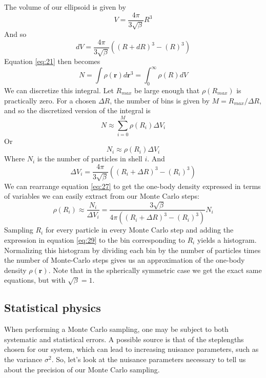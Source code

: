 \documentclass[
    a4paper, aps, twocolumn, floatfix, superscriptaddress,
    nofootinbib]{revtex4-1}
\begin{document}
\begin{figure}[H]
\makebox[0.5\textwidth][c]{}%
 \caption{}
 \label{fig:1}
\end{figure}
The volume of our ellipsoid is given by 
\begin{equation}
    V = \frac{4\pi}{3\sqrt{\beta}} R^3
\end{equation}
And so 
\begin{equation}
    dV =\frac{4\pi}{3\sqrt{\beta}}\left((R+dR)^3-(R)^3 \right)
\end{equation}
Equation \eqref{eq:21} then becomes
\begin{equation}
   N= \int \rho(\boldsymbol{r}) d\boldsymbol{r}^3 = \int_0^{\infty} \rho(R) dV \label{eq:onebody_density_integral}
\end{equation}
We can discretize this integral. Let $R_{max}$ be large enough that $\rho(R_{max})$ is practically zero. For a chosen $\Delta R$, the number of bins is given by $M = R_{max}/\Delta R$, and so the discretized version of the integral is
\begin{equation}
    N \approx \sum_{i=0}^{M} \rho(R_i)  \Delta V_i
\end{equation}
Or 
\begin{equation}\label{eq:27}
    N_i \approx\rho(R_i) \Delta V_i
\end{equation}
Where $N_i$ is the number of particles in shell $i$. And 
\begin{equation}
    \Delta V_i =\frac{4\pi}{3\sqrt{\beta}}\left((R_i+\Delta R)^3-(R_i)^3 \right)
\end{equation}
We can rearrange equation \eqref{eq:27} to get the one-body density expressed in terms of variables we can easily extract from our Monte Carlo steps: 
\begin{equation}\label{eq:29}
   \rho(R_i)   \approx \frac{N_i}{\Delta V_i} = \frac{3\sqrt{\beta}}{4 \pi \left((R_i+\Delta R)^3-(R_i)^3 \right)} N_i
\end{equation}
Sampling $R_i$ for every particle in every Monte Carlo step and adding the expression in equation \eqref{eq:29} to the bin corresponding to $R_i$ yields a histogram. Normalizing this histogram by dividing each bin by the number of particles times the number of Monte-Carlo steps gives us an  approximation of the one-body density $\rho(\boldsymbol{r})$. Note that in the spherically symmetric case we get the exact same equations, but with $\sqrt{\beta} = 1$.


\subsection{Statistical physics}
When performing a Monte Carlo sampling, one may be subject to both systematic and statistical errors. A possible source is that of the steplengths chosen for our system, which can lead to increasing nuisance parameters, such as the variance $\sigma^2$. So, let's look at the nuisance parameters necessary to tell us about the precision of our Monte Carlo sampling.
\end{document}
